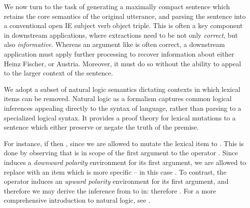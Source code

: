 
We now turn to the task of generating a maximally compact sentence which retains
  the core semantics of the original utterance, and parsing the sentence
  into a conventional open IE subject verb object triple.
This is often a key component in downstream applications, where extractions
  need to be not only \textit{correct}, but also \textit{informative}.
Whereas an argument like  is often correct,
  a downstream application must apply further processing to recover information
  about either Heinz Fischer, or Austria.
Moreover, it must do so without the ability to appeal to the larger context
  of the sentence.

We adopt a subset of natural logic semantics dictating
  contexts in which lexical items can be removed.
Natural logic as a formalism captures common logical inferences
  appealing directly to the syntax of language, rather than parsing to a
  specialized logical syntax.
It provides a proof theory for lexical mutations to a sentence which either
  preserve or negate the truth of the premise.

For instance, if  then 
  , since we are allowed to mutate
  the lexical item  to .
This is done by observing that  is in scope of the first
  argument to the operator .
Since  induces a \textit{downward polarity} environment for
  its first argument, we are allowed
  to replace  with an item which is more specific -- in this case
  .
To contrast, the operator  induces an \textit{upward polarity}
  environment for its first argument,
  and therefore we may derive the inference from
   to  in:
   therefore .
For a more comprehensive introduction to natural logic, see
  .

